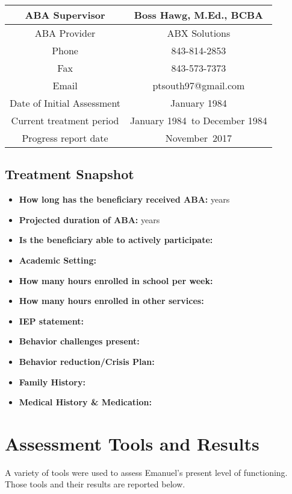 \documentclass{article}
\def\initial{January 1984}
\def\start{January 1984}
\def\ending{December 1984}
\def\progduemonth{November}
\def\progdueyear{2017}
\def\BCBA{Boss Hawg}
\begin{document}
		\begin{tabular}{|c||c|} 
		\hline\hline
		ABA Supervisor & \BCBA, M.Ed., BCBA\\
		\hline\hline
		ABA Provider &  ABX Solutions \\
		\hline\hline
		Phone & 843-814-2853 \\
		\hline\hline
		Fax & 843-573-7373\\
		\hline\hline
		Email & ptsouth97@gmail.com\\
		\hline\hline
		Date of Initial Assessment & \initial\\
		\hline\hline
		Current treatment period & \start\ to \ending\\
		\hline\hline
		Progress report date & \progduemonth\ \progdueyear\\
		\hline\hline
		\end{tabular}

	\subsection{Treatment Snapshot}

		\begin{itemize}
		\item \textbf{How long has the beneficiary received ABA:} years
		\item \textbf{Projected duration of ABA:} years
		\item \textbf{Is the beneficiary able to actively participate:} 
		\item \textbf{Academic Setting:} 
		\item \textbf{How many hours enrolled in school per week:}
		\item \textbf{How many hours enrolled in other services:} 
		\item \textbf{IEP statement:}  
		\item \textbf{Behavior challenges present:} 
		\item \textbf{Behavior reduction/Crisis Plan:} 
		\item \textbf{Family History:} 
		\item \textbf{Medical History \& Medication:} 
		\end{itemize}

\section{Assessment Tools and Results}
A variety of tools were used to assess Emanuel’s present level of functioning.  Those tools and their results are reported below.  
\end{document}
